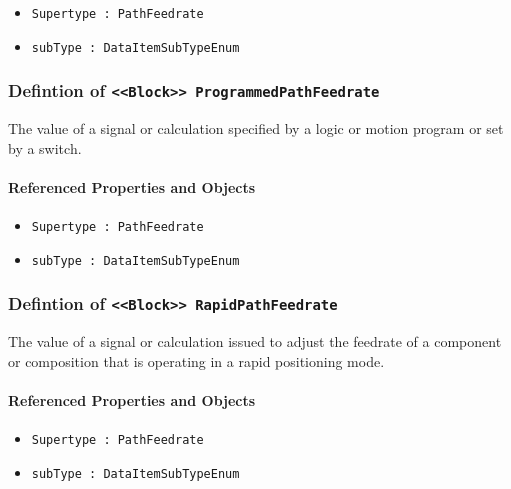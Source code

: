 \begin{itemize}
\item \texttt{Supertype : PathFeedrate}

\item \texttt{subType : DataItemSubTypeEnum}

\end{itemize}
\FloatBarrier
\subsubsection{Defintion of \texttt{<<Block>> ProgrammedPathFeedrate}}
  \label{type:ProgrammedPathFeedrate}

\FloatBarrier

The value of a signal or calculation specified by a logic or motion program or set by a switch.

\FloatBarrier
\paragraph{Referenced Properties and Objects}

\begin{itemize}
\item \texttt{Supertype : PathFeedrate}

\item \texttt{subType : DataItemSubTypeEnum}

\end{itemize}
\FloatBarrier
\subsubsection{Defintion of \texttt{<<Block>> RapidPathFeedrate}}
  \label{type:RapidPathFeedrate}

\FloatBarrier

The value of a signal or calculation issued to adjust the feedrate of a component or composition that is operating in a rapid positioning mode.

\FloatBarrier
\paragraph{Referenced Properties and Objects}

\begin{itemize}
\item \texttt{Supertype : PathFeedrate}

\item \texttt{subType : DataItemSubTypeEnum}

\end{itemize}
\FloatBarrier

